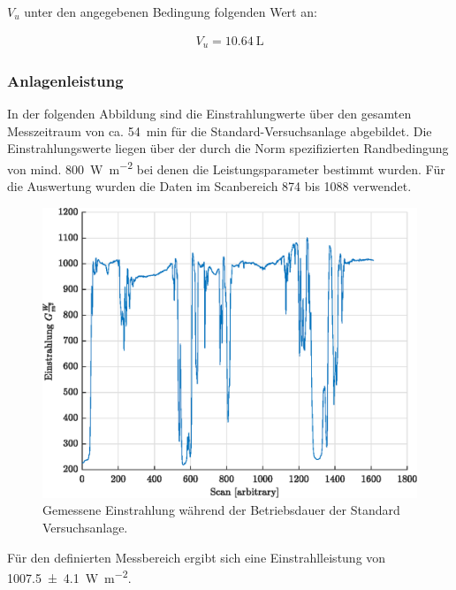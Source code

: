 $V_u$ unter den angegebenen Bedingung folgenden Wert an:

\begin{equation*}
	\label{MAG-Ber.}
	\begin{aligned}
	V_u=  \SI{10,64}{\liter}
	\end{aligned}
\end{equation*}

\subsubsection{Anlagenleistung}

In der folgenden Abbildung sind die Einstrahlungwerte über den gesamten Messzeitraum von ca. \SI{54}{\minute} für die Standard-Versuchsanlage abgebildet. 
Die Einstrahlungswerte liegen über der durch die Norm spezifizierten Randbedingung von mind. \SI{800}{\watt\per\meter\squared} bei denen die Leistungsparameter bestimmt wurden. Für die Auswertung wurden die Daten im Scanbereich 874 bis 1088 verwendet.

\begin{figure}[H]
	\centering
	\includegraphics[height=0.3\textheight]{../DATA/DataEinstrahlung.eps}
	\caption[Gemessene Einstrahlung während der Betriebsdauer der Standard Versuchsanlage]{Gemessene Einstrahlung während der Betriebsdauer der Standard Versuchsanlage.}
	\label{fig:Einstrahlung}
\end{figure}

Für den definierten Messbereich ergibt sich eine Einstrahlleistung von \SI{1007.5(41)}{\watt\per\meter\squared}.

